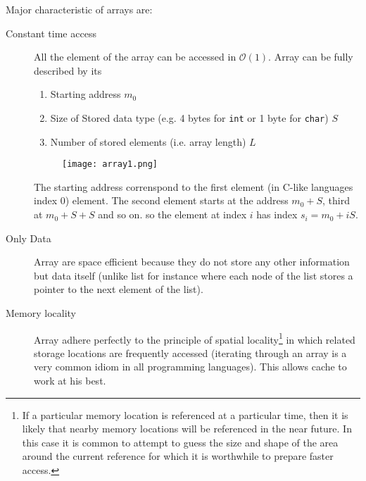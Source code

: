 Major characteristic of arrays are:
\begin{description}
\item [Constant time access] All the element of the array can be accessed in $\mathcal{O}(1)$. Array can be fully described by its
	\begin{enumerate}
		\item Starting address $m_0$
		\item Size of Stored data type (e.g. 4 bytes for \texttt{int} or 1 byte for \texttt{char}) $S$
		\item Number of stored elements (i.e. array length) $L$
	\end{enumerate}
	\begin{figure}[h]
		\texttt{[image: array1.png]}
	\end{figure}
	The starting address correnspond to the first element (in C-like languages index $0$) element.
	 The second element starts at the address  $m_0 + S$, third at $m_0 + S + S$ and so on. so the element at index $i$ has index $s_i = m_0 +iS$.
	
\item [Only Data] Array are space efficient because they do not store any other information but data itself (unlike list for instance where each node of the list stores a pointer to the next element of the list). 
 
\item [Memory locality] Array adhere perfectly to the principle of spatial locality\footnote{If a particular memory location is referenced at a particular time, then it is likely that nearby memory locations will be referenced in the near future. In this case it is common to attempt to guess the size and shape of the area around the current reference for which it is worthwhile to prepare faster access.} in which related storage locations are frequently accessed (iterating through an array is a very common idiom in all programming languages). This allows cache to work at his best.
\end{description}


